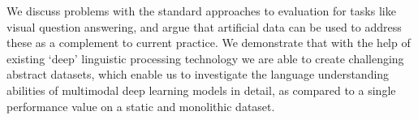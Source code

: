 We discuss problems with the standard approaches to evaluation for tasks like visual question answering, and argue that artificial data can be used to address these as a complement to current practice. We demonstrate that with the help of existing `deep' linguistic processing technology we are able to create challenging abstract datasets, which enable us to investigate the language understanding abilities of multimodal deep learning models in detail, as compared to a single performance value on a static and monolithic dataset.
